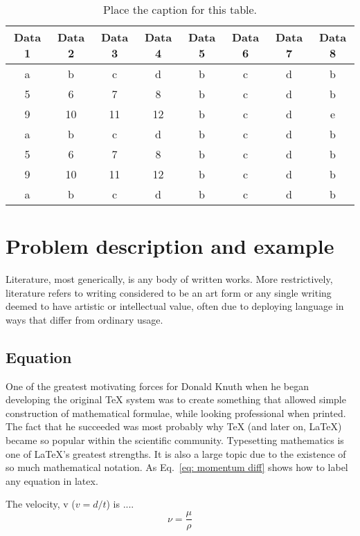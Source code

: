 \documentclass[11pt, a4paper]{article}
\begin{document}
\begin{table}
	\centering
	\caption{Place the caption for this table.}
	\label{tab:sample2}
	\renewcommand{\arraystretch}{1.5}
	\begin{tabular*}{\linewidth}{c @{\extracolsep{\fill}} ccccccc}
		\hline 
		Data 1 & Data 2 & Data 3 & Data 4 & Data 5 & Data 6 & Data 7 & Data 8\\ \hline
		a & b & c & d & b & c & d & b \\ 
		5 & 6 & 7 & 8 & b & c & d & b \\ 
		9 & 10 & 11 & 12 & b  & c & d & e \\ 
		a & b & c & d & b & c & d & b \\ 
		5 & 6 & 7 & 8 & b & c & d & b \\ 
		9 & 10 & 11 & 12 & b & c  & d & b \\ 
		a & b & c & d & b & c & d & b \\ \hline 
	\end{tabular*} 
\end{table}

\section{Problem description and example}\label{sec:lit}
Literature, most generically, is any body of written works. More restrictively, literature refers to writing considered to be an art form or any single writing deemed to have artistic or intellectual value, often due to deploying language in ways that differ from ordinary usage.

\subsection{Equation}
One of the greatest motivating forces for Donald Knuth when he began developing the original TeX system was to create something that allowed simple construction of mathematical formulae, while looking professional when printed. The fact that he succeeded was most probably why TeX (and later on, LaTeX) became so popular within the scientific community. Typesetting mathematics is one of LaTeX's greatest strengths. It is also a large topic due to the existence of so much mathematical notation. As Eq.~\ref{eq: momentum diff} shows how to label any equation in latex. 

The velocity, v ($v=d/t$) is ....
%
\begin{equation}\label{eq: momentum diff}
\nu = \frac{\mu}{\rho}
\end{equation}
\end{document}
